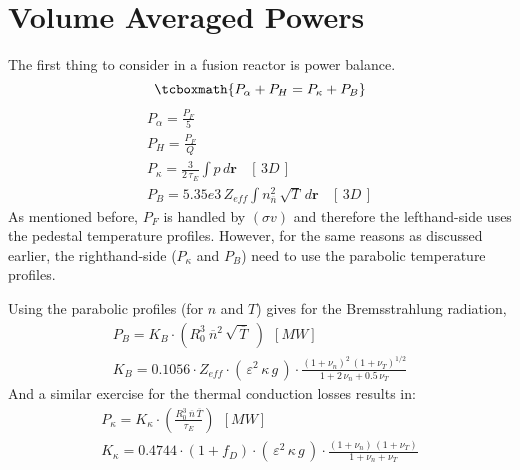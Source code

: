 \section{Volume Averaged Powers}

The first thing to consider in a fusion reactor is power balance. 
\label{pwr_bal}
\begin{equation}
\tcboxmath{
P_\alpha + P_H = P_\kappa + P_B }
\end{equation}
\begin{gather}
	P_\alpha = \frac{P_F}{5} \\
	P_H = \frac{P_F}{Q} \\
	P_\kappa = \frac{3}{2 \, \tau_E} \int p \, d\textbf{r} \ \ \ \ [ \, 3D \, ] \\
	P_B = 5.35e3 \, Z_{eff} \int n_{\overline{n}}^2 \, \sqrt{T} \, d\textbf{r} \ \ \ \ [ \, 3D \, ]
\end{gather}
As mentioned before, $P_F$ is handled by $(\sigma v)$ and therefore the lefthand-side uses the pedestal temperature profiles. However, for the same reasons as discussed earlier, the righthand-side ($P_\kappa$ and $P_B$) need to use the parabolic temperature profiles.

Using the parabolic profiles (for $n$ and $T$) gives for the Bremsstrahlung radiation,
\begin{gather}
	P_B = K_B \cdot \left( R_0^3 \ \overline{n}^2 \, \sqrt{\,\overline{T}} \ \right) \ \ [MW] \\
	K_B = 0.1056 \cdot Z_{eff} \cdot ( \, \varepsilon^2 \, \kappa \, g \, ) \cdot \frac{ (1+\nu_n)^2 \, (1+\nu_T)^{1/2} }{1+2 \, \nu_n + 0.5 \, \nu_T}
\end{gather}
And a similar exercise for the thermal conduction losses results in:
\begin{gather}
	P_\kappa = K_\kappa \cdot \left( \frac{ R_0 ^ 3 \ \overline{n}  \, \overline{T} }{\tau_E} \right) \ \ [MW] \\
	K_\kappa = 0.4744 \cdot  ( 1 + f_D ) \cdot ( \, \varepsilon^2 \, \kappa \, g \, ) \cdot \frac{ (1 + \nu_n) \, (1 + \nu_T) }{1 + \nu_n + \nu_T }
\end{gather}

\clearpage
\newpage





